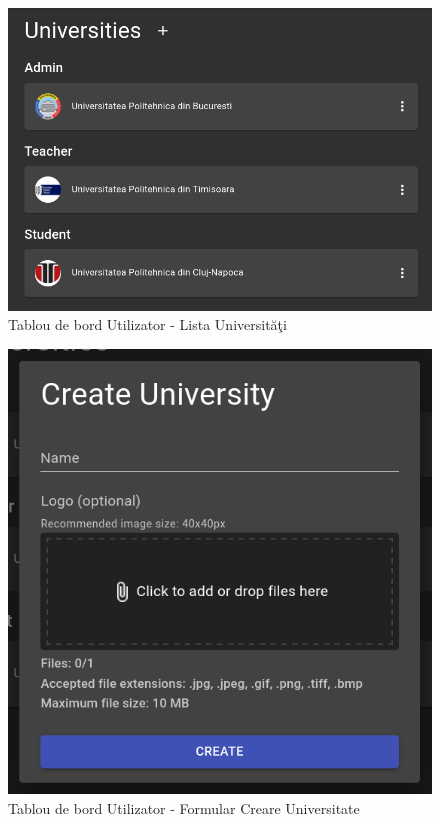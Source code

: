 \documentclass[12pt, a4paper, oneside, romanian]{teza-upb}
\begin{document}
\begin{figure}[H]
\centering
\includegraphics*[width=\columnwidth]{tablou-de-bord-utilizator-lista-universitati}
\caption{Tablou de bord Utilizator - Lista Universităţi}
\label{tablou-de-bord-utilizator-lista-universitati}
\end{figure}

\begin{figure}[H]
\centering
\includegraphics*[width=0.6\columnwidth]{tablou-de-bord-utilizator-formular-creare-universitate}
\caption{Tablou de bord Utilizator - Formular Creare Universitate}
\label{tablou-de-bord-utilizator-formular-creare-universitate}
\end{figure}
\end{document}
